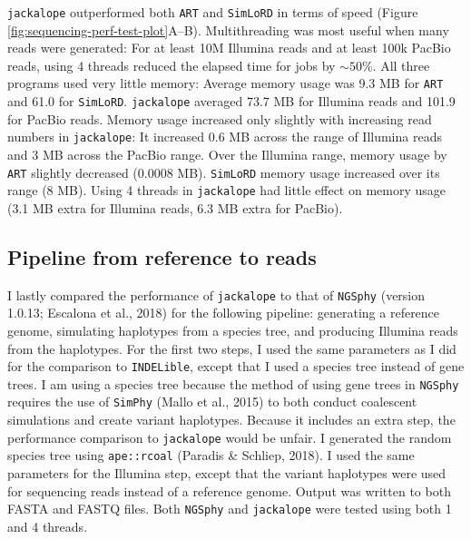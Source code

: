 \documentclass[12pt,]{article}
\begin{document}
\texttt{jackalope} outperformed both \texttt{ART} and \texttt{SimLoRD} in terms of speed
(Figure \ref{fig:sequencing-perf-test-plot}A--B).
Multithreading was most useful when many reads were generated:
For at least 10M Illumina reads and at least 100k PacBio reads, using 4 threads
reduced the elapsed time for jobs by \(\sim 50 \%\).
All three programs used very little memory:
Average memory usage was 9.3 MB for \texttt{ART} and
61.0 for \texttt{SimLoRD}.
\texttt{jackalope} averaged 73.7 MB for Illumina reads and
101.9 for PacBio reads.
Memory usage increased only slightly with increasing read numbers in \texttt{jackalope}:
It increased 0.6 MB across the range of
Illumina reads and 3 MB across the PacBio range.
Over the Illumina range, memory usage by \texttt{ART} slightly decreased
(0.0008 MB).
\texttt{SimLoRD} memory usage increased over its range
(8 MB).
Using 4 threads in \texttt{jackalope} had little effect on memory usage
(3.1 MB extra for Illumina reads,
6.3 MB extra for PacBio).

\hypertarget{pipeline-from-reference-to-reads}{%
\subsection{Pipeline from reference to reads}\label{pipeline-from-reference-to-reads}}

I lastly compared the performance of \texttt{jackalope} to that of \texttt{NGSphy}
(version 1.0.13; Escalona et al., 2018)
for the following pipeline:
generating a reference genome, simulating haplotypes from a species tree, and
producing Illumina reads from the haplotypes.
For the first two steps, I used the same parameters as I did for the comparison to
\texttt{INDELible}, except that I used a species tree instead of gene trees.
I am using a species tree because the method of using gene trees in \texttt{NGSphy} requires
the use of \texttt{SimPhy} (Mallo et al., 2015) to both conduct coalescent simulations and
create variant haplotypes.
Because it includes an extra step, the performance comparison to \texttt{jackalope} would
be unfair.
I generated the random species tree using \texttt{ape::rcoal} (Paradis \& Schliep, 2018).
I used the same parameters for the Illumina step, except that the variant haplotypes
were used for sequencing reads instead of a reference genome.
Output was written to both FASTA and FASTQ files.
Both \texttt{NGSphy} and \texttt{jackalope} were tested using both 1 and 4 threads.
\end{document}

